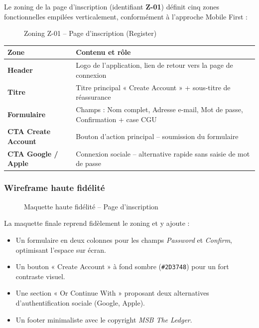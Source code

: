 Le zoning de la page d'inscription (identifiant \textbf{Z-01}) définit cinq zones fonctionnelles empilées verticalement, conformément à l'approche Mobile First :

\begin{figure}[H]
    \centering
    \caption{Zoning Z-01 -- Page d'inscription (Register)}
    \label{fig:zoning-register}
\end{figure}

\begin{center}
\small
\begin{tabular}{|p{}|p{}|}
\hline
\textbf{Zone} & \textbf{Contenu et rôle} \\
\hline
\textbf{Header} & Logo de l'application, lien de retour vers la page de connexion \\
\hline
\textbf{Titre} & Titre principal « Create Account » + sous-titre de réassurance \\
\hline
\textbf{Formulaire} & Champs : Nom complet, Adresse e-mail, Mot de passe, Confirmation + case CGU \\
\hline
\textbf{CTA Create Account} & Bouton d'action principal -- soumission du formulaire \\
\hline
\textbf{CTA Google / Apple} & Connexion sociale -- alternative rapide sans saisie de mot de passe \\
\hline
\end{tabular}
\end{center}

\subsubsection{Wireframe haute fidélité}

\begin{figure}[H]
    \centering
    \caption{Maquette haute fidélité -- Page d'inscription}
    \label{fig:wireframe-register}
\end{figure}

La maquette finale reprend fidèlement le zoning et y ajoute :
\begin{itemize}
    \item Un formulaire en deux colonnes pour les champs \textit{Password} et \textit{Confirm}, optimisant l'espace sur écran.
    \item Un bouton « Create Account » à fond sombre (\texttt{\#2D3748}) pour un fort contraste visuel.
    \item Une section « Or Continue With » proposant deux alternatives d'authentification sociale (Google, Apple).
    \item Un footer minimaliste avec le copyright \textit{MSB The Ledger}.
\end{itemize}



